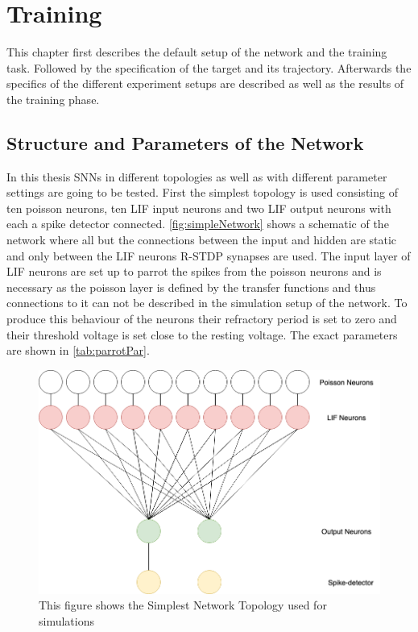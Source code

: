 
\chapter{Training}\label{chapter:Training}
This chapter first describes the default setup of the network and the training task. Followed by the specification of the target and its trajectory. Afterwards the specifics of the different experiment setups are described as well as the results of the training phase.
\section{Structure and Parameters of the Network}
In this thesis SNNs in different topologies as well as with different parameter settings are going to be tested. First the simplest topology is used consisting of ten poisson neurons, ten LIF input neurons and two LIF output neurons with each a spike detector connected. \autoref{fig:simpleNetwork} shows a schematic of the network where all but the connections between the input and hidden are static and only between the LIF neurons R-STDP synapses are used. The input layer of LIF neurons are set up to parrot the spikes from the poisson neurons and is necessary as the poisson layer is defined by the transfer functions and thus connections to it can not be described in the simulation setup of the network. To produce this behaviour of the neurons their refractory period is set to zero and their threshold voltage is set close to the resting voltage. The exact parameters are shown in \autoref{tab:parrotPar}.


\begin{figure}[htpb]
  \centering
  \includegraphics[width=\textwidth]{figures/plots/simpleNetwork}
  \caption [Simple Network]{This figure shows the Simplest Network Topology used for simulations}
  \label{fig:simpleNetwork}
\end{figure}

